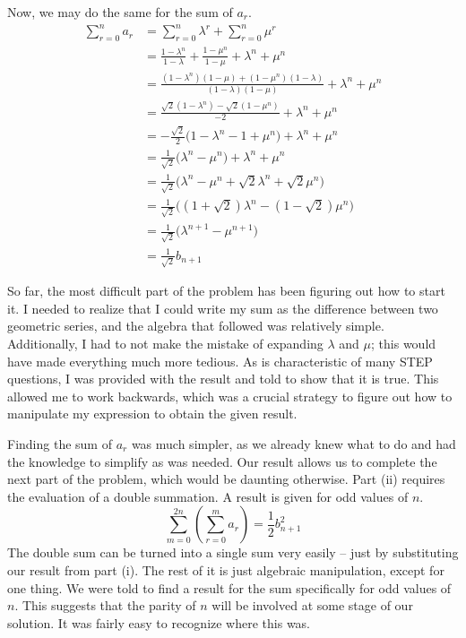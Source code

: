 \documentclass[12pt]{article}
\begin{document}
Now, we may do the same for the sum of $a_r$.
\begin{align*}
    \sum_{r=0}^{n} a_r & = \sum_{r=0}^{n} \lambda^r + \sum_{r=0}^{n} \mu^r                                                \\
                       & = \frac{1-\lambda^n}{1-\lambda} + \frac{1-\mu^n}{1-\mu} + \lambda^n + \mu^n                      \\
                       & = \frac{(1-\lambda^n)(1-\mu) + (1-\mu^n)(1-\lambda)}{(1-\lambda)(1-\mu)} + \lambda^n + \mu^n     \\
                       & = \frac{\sqrt{2}(1-\lambda^n) - \sqrt{2}(1-\mu^n)}{-2} + \lambda^n + \mu^n                       \\
                       & = -\frac{\sqrt{2}}{2}\bigg(1-\lambda^n - 1 + \mu^n\bigg) + \lambda^n + \mu^n                     \\
                       & = \frac{1}{\sqrt{2}}\bigg(\lambda^n - \mu^n\bigg) + \lambda^n + \mu^n                            \\
                       & = \frac{1}{\sqrt{2}}\bigg(\lambda^n - \mu^n + \sqrt{2}\lambda^n + \sqrt{2}\mu^n \bigg)           \\
                       & = \frac{1}{\sqrt{2}}\bigg(\left(1+\sqrt{2}\right)\lambda^n - \left(1-\sqrt{2}\right)\mu^n \bigg) \\
                       & = \frac{1}{\sqrt{2}}\bigg(\lambda^{n+1} - \mu^{n+1} \bigg)                                       \\
                       & = \frac{1}{\sqrt{2}}b_{n+1}
\end{align*}

So far, the most difficult part of the problem has been figuring out how to start it.
I needed to realize that I could write my sum as the difference between two geometric series, and the algebra that followed was relatively simple.
Additionally, I had to not make the mistake of expanding $\lambda$ and $\mu$; this would have made everything much more tedious.
As is characteristic of many STEP questions, I was provided with the result and told to show that it is true.
This allowed me to work backwards, which was a crucial strategy to figure out how to manipulate my expression to obtain the given result.

Finding the sum of $a_r$ was much simpler, as we already knew what to do and had the knowledge to simplify as was needed.
Our result allows us to complete the next part of the problem, which would be daunting otherwise.
Part (ii) requires the evaluation of a double summation.
A result is given for odd values of $n$.
\begin{equation}
    \sum_{m=0}^{2n} \left(\sum_{r=0}^{m} a_r\right) = \frac{1}{2} b^2_{n+1}
\end{equation}
The double sum can be turned into a single sum very easily -- just by substituting our result from part (i).
The rest of it is just algebraic manipulation, except for one thing.
We were told to find a result for the sum specifically for odd values of $n$.
This suggests that the parity of $n$ will be involved at some stage of our solution.
It was fairly easy to recognize where this was.
\end{document}
